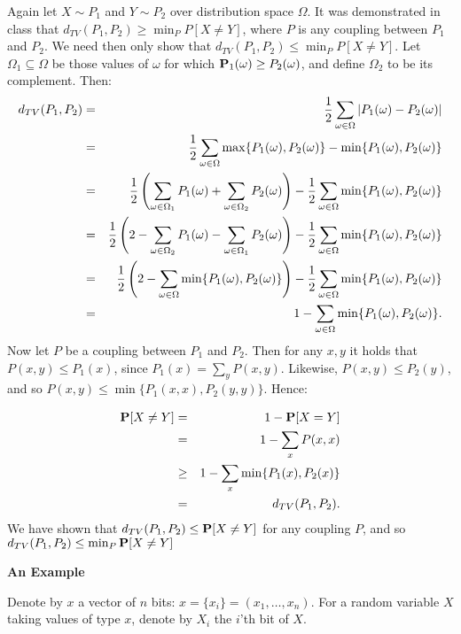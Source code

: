 \documentclass[11pt]{article} \usepackage{amssymb}
\begin{document}
Again let $X\sim P_1$ and $Y\sim P_2$ over distribution space $\Omega$. 
It was demonstrated in class that $d_{TV}(P_1,P_2)\geq \min_P P[X\neq Y]$, where $P$ is any
coupling between $P_1$ and $P_2$. 
We need then only
show that $d_{TV}(P_1,P_2)\leq \min_P P[X\neq Y]$. Let $\Omega_1 \subseteq \Omega$ be those
values of $\omega$ for which $\P_1(\omega)\geq P_2(\omega)$, and define 
$\Omega_2$ to be its complement. Then:
\begin{eqnarray*}
  d_{TV}(P_1,P_2)&=&{1\over 2}\sum_{\omega \in \Omega}|P_1(\omega)-P_2(\omega)|
  \\ &=& {1\over 2}\sum_{\omega \in \Omega}\max\{P_1(\omega),P_2(\omega)\}
  - \min\{P_1(\omega),P_2(\omega)\}
  \\ &=& {1\over 2}\left(\sum_{\omega\in\Omega_1}P_1(\omega)
  + \sum_{\omega\in\Omega_2}P_2(\omega)\right)
  - {1\over 2}\sum_{\omega \in \Omega}\min\{P_1(\omega),P_2(\omega)\}
  \\ &=& {1\over 2}\left(2-\sum_{\omega\in\Omega_2}P_1(\omega)
  - \sum_{\omega\in\Omega_1}P_2(\omega)\right)
  - {1\over 2}\sum_{\omega \in \Omega}\min\{P_1(\omega),P_2(\omega)\}
  \\ &=& {1\over 2}\left(2-
    \sum_{\omega \in \Omega}\min\{P_1(\omega),P_2(\omega)\}  \right)
  - {1\over 2}\sum_{\omega \in \Omega}\min\{P_1(\omega),P_2(\omega)\}
  \\ &=& 1- \sum_{\omega \in \Omega}\min\{P_1(\omega),P_2(\omega)\}.
\end{eqnarray*}
Now let $P$ be a coupling between $P_1$ and $P_2$. Then for any $x,y$ it holds
that $P(x,y)\leq P_1(x)$, since $P_1(x)=\sum_yP(x,y)$. 
Likewise, $P(x,y)\leq P_2(y)$, and so $P(x,y)\leq \min\{P_1(x,x),P_2(y,y)\}$. Hence:

\begin{eqnarray*}
\P[X\neq Y]&=&1-\P[X=Y]
\\ &=& 1-\sum_x P(x,x)  
\\ &\geq&1-\sum_x \min\{P_1(x),P_2(x)\}
\\ &=& d_{TV}(P_1,P_2).
\end{eqnarray*}
We have shown that  $d_{TV}(P_1,P_2)\leq \P[X\neq Y]$ for any coupling $P$,
and so $d_{TV}(P_1,P_2)\leq \min_P\P[X\neq Y]$


{\bf An Example}

Denote by $x$ a vector of $n$ bits: $x=\{x_i\}=(x_1,\ldots,x_n)$. For a
random variable $X$ taking values of type $x$, denote by
$X_i$ the $i$'th bit of $X$.
\end{document}
